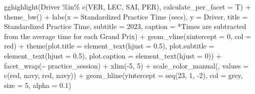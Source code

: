 \documentclass[
]{book}
\newenvironment{Shaded}{\begin{snugshade}}{\end{snugshade}}
\newcommand{\AttributeTok}[1]{\textcolor[rgb]{0.77,0.63,0.00}{#1}}
\newcommand{\DecValTok}[1]{\textcolor[rgb]{0.00,0.00,0.81}{#1}}
\newcommand{\FloatTok}[1]{\textcolor[rgb]{0.00,0.00,0.81}{#1}}
\newcommand{\FunctionTok}[1]{\textcolor[rgb]{0.00,0.00,0.00}{#1}}
\newcommand{\NormalTok}[1]{#1}
\newcommand{\SpecialCharTok}[1]{\textcolor[rgb]{0.00,0.00,0.00}{#1}}
\newcommand{\StringTok}[1]{\textcolor[rgb]{0.31,0.60,0.02}{#1}}
\begin{document}
\begin{Shaded}
\begin{Highlighting}[]
  \FunctionTok{gghighlight}\NormalTok{(Driver }\SpecialCharTok{\%in\%} \FunctionTok{c}\NormalTok{(}\StringTok{\textquotesingle{}VER\textquotesingle{}}\NormalTok{, }\StringTok{\textquotesingle{}LEC\textquotesingle{}}\NormalTok{, }\StringTok{\textquotesingle{}SAI\textquotesingle{}}\NormalTok{, }\StringTok{\textquotesingle{}PER\textquotesingle{}}\NormalTok{), }\AttributeTok{calculate\_per\_facet =}\NormalTok{ T) }\SpecialCharTok{+}
   \FunctionTok{theme\_bw}\NormalTok{() }\SpecialCharTok{+}
   \FunctionTok{labs}\NormalTok{(}\AttributeTok{x =} \StringTok{\textquotesingle{}Standardized Practice Time (secs)\textquotesingle{}}\NormalTok{,}
        \AttributeTok{y =} \StringTok{\textquotesingle{}Driver\textquotesingle{}}\NormalTok{,}
        \AttributeTok{title =} \StringTok{\textquotesingle{}Standardized Practice Time\textquotesingle{}}\NormalTok{,}
        \AttributeTok{subtitle =} \StringTok{\textquotesingle{}2023\textquotesingle{}}\NormalTok{,}
        \AttributeTok{caption =} \StringTok{\textquotesingle{}*Times are subtracted from the average time for each Grand Prix\textquotesingle{}}\NormalTok{) }\SpecialCharTok{+}
   \FunctionTok{geom\_vline}\NormalTok{(}\AttributeTok{xintercept =} \DecValTok{0}\NormalTok{, }\AttributeTok{col =} \StringTok{\textquotesingle{}red\textquotesingle{}}\NormalTok{) }\SpecialCharTok{+}
   \FunctionTok{theme}\NormalTok{(}\AttributeTok{plot.title =} \FunctionTok{element\_text}\NormalTok{(}\AttributeTok{hjust =} \FloatTok{0.5}\NormalTok{),}
         \AttributeTok{plot.subtitle =} \FunctionTok{element\_text}\NormalTok{(}\AttributeTok{hjust =} \FloatTok{0.5}\NormalTok{),}
         \AttributeTok{plot.caption =} \FunctionTok{element\_text}\NormalTok{(}\AttributeTok{hjust =} \DecValTok{0}\NormalTok{)) }\SpecialCharTok{+}
  \FunctionTok{facet\_wrap}\NormalTok{(}\SpecialCharTok{\textasciitilde{}}\NormalTok{ practice\_session) }\SpecialCharTok{+}
  \FunctionTok{xlim}\NormalTok{(}\SpecialCharTok{{-}}\DecValTok{5}\NormalTok{, }\DecValTok{5}\NormalTok{) }\SpecialCharTok{+}
  \FunctionTok{scale\_color\_manual}\NormalTok{(}\StringTok{\textquotesingle{}\textquotesingle{}}\NormalTok{, }\AttributeTok{values =} \FunctionTok{c}\NormalTok{(}\StringTok{\textquotesingle{}red\textquotesingle{}}\NormalTok{, }\StringTok{\textquotesingle{}navy\textquotesingle{}}\NormalTok{, }\StringTok{\textquotesingle{}red\textquotesingle{}}\NormalTok{, }\StringTok{\textquotesingle{}navy\textquotesingle{}}\NormalTok{))  }\SpecialCharTok{+}
  \FunctionTok{geom\_hline}\NormalTok{(}\AttributeTok{yintercept =} \FunctionTok{seq}\NormalTok{(}\DecValTok{23}\NormalTok{, }\DecValTok{1}\NormalTok{, }\SpecialCharTok{{-}}\DecValTok{2}\NormalTok{), }\AttributeTok{col =} \StringTok{\textquotesingle{}grey\textquotesingle{}}\NormalTok{, }\AttributeTok{size =} \DecValTok{5}\NormalTok{, }\AttributeTok{alpha =}  \FloatTok{0.1}\NormalTok{)}
\end{Highlighting}
\end{Shaded}
\end{document}

